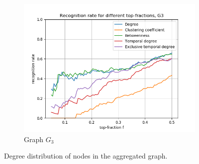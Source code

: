 \documentclass[letterpaper]{article}
\begin{document}
\begin{figure}
\begin{subfigure}[b]{0.32\textwidth}
        \includegraphics[width=\textwidth]{img/rankG3.png}
        \caption{Graph \(G_3\)}
	    \label{fig:recognition_rates_G3}
    \end{subfigure}
    \caption{Degree distribution of nodes in the aggregated graph.}
    \label{fig:recognition_rates}


\end{figure}
\end{document}
